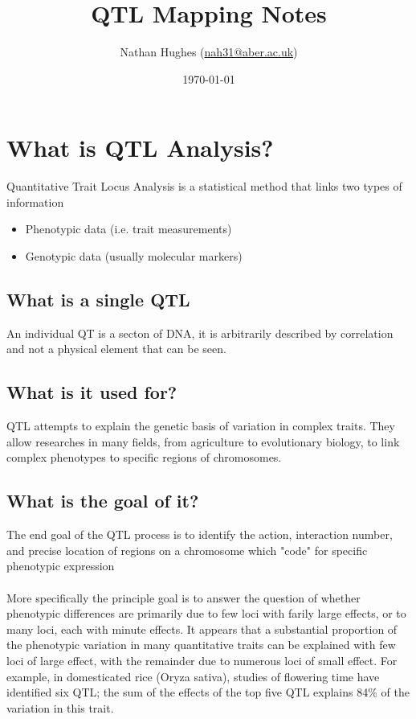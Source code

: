 \documentclass[a4paper]{article}
\author{Nathan Hughes (\href{mailto:nah31@aber.ac.uk}{nah31@aber.ac.uk})}
\date{\today}
\title{QTL Mapping Notes}
\begin{document}
\maketitle
\maketitle
\clearpage
\tableofcontents
\clearpage





\section{What is QTL Analysis?}
\label{sec-1}
Quantitative Trait Locus  Analysis is a statistical method that links two types of information
\begin{itemize}
\item Phenotypic data (i.e. trait measurements)
\item Genotypic data (usually molecular markers)
\end{itemize}

\subsection{What is a single QTL}
\label{sec-1-1}
An individual QT is a secton of DNA, it is arbitrarily described by correlation and not a physical element that can be seen. 

\subsection{What is it used for?}
\label{sec-1-2}
QTL attempts to explain the genetic basis of variation in complex traits. 
They allow researches in many fields, from agriculture to evolutionary biology, to link complex phenotypes to specific 
regions of chromosomes. 

\subsection{What is the goal of it?}
\label{sec-1-3}
The end goal of the QTL process is to identify the action, interaction number, and precise location of regions on a chromosome 
which "code" for specific phenotypic expression
\\
\\
More specifically the principle goal is to answer the question of whether phenotypic differences are primarily due to few loci with farily
large effects, or to many loci, each with minute effects. It appears that a substantial proportion of the phenotypic variation in many quantitative 
traits can be explained with few loci of large effect, with the remainder due to numerous loci of small effect. 
For example, in domesticated rice (Oryza sativa), studies of flowering time have identified six QTL; the sum of the effects
of the top five QTL explains 84\% of the variation in this trait. 
\end{document}
